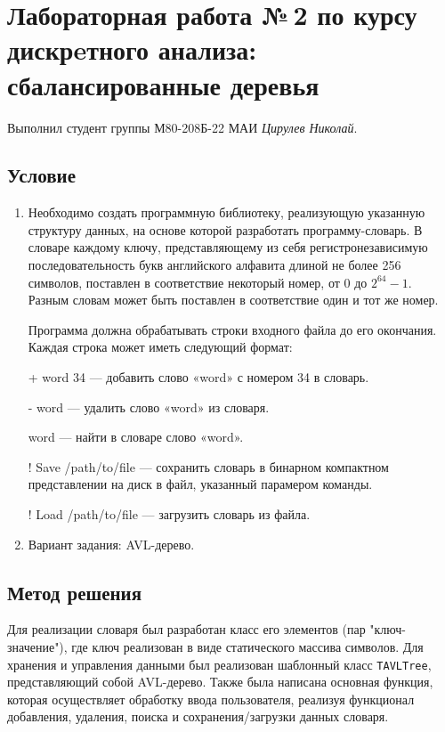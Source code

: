 \documentclass[12pt]{article}
\begin{document}
\section*{Лабораторная работа №\,2 по курсу дискрeтного анализа: сбалансированные деревья}

Выполнил студент группы М80-208Б-22 МАИ \textit{Цирулев Николай}.

\subsection*{Условие}
\begin{enumerate}
\item


    Необходимо создать программную библиотеку, реализующую указанную структуру данных, на основе которой разработать программу-словарь. В словаре каждому ключу, представляющему из себя регистронезависимую последовательность букв английского алфавита длиной не более 256 символов, поставлен в соответствие некоторый номер, от 0 до $2^{64} - 1$. Разным словам может быть поставлен в соответствие один и тот же номер.

    Программа должна обрабатывать строки входного файла до его окончания. Каждая строка может иметь следующий формат:
    
    + word 34 — добавить слово «word» с номером 34 в словарь. 
    
    - word — удалить слово «word» из словаря. 
    
    word — найти в словаре слово «word». 
    
    ! Save /path/to/file — сохранить словарь в бинарном компактном представлении на диск в файл, указанный парамером команды. 
    
    ! Load /path/to/file — загрузить словарь из файла. 

\item
    Вариант задания: AVL-дерево.
\end{enumerate}

\subsection*{Метод решения}

Для реализации словаря был разработан класс его элементов (пар "ключ-значение"), где ключ реализован в виде статического массива символов. Для хранения и управления данными был реализован шаблонный класс \texttt{TAVLTree}, представляющий собой AVL-дерево. Также была написана основная функция, которая осуществляет обработку ввода пользователя, реализуя функционал добавления, удаления, поиска и сохранения/загрузки данных словаря.
\end{document}
